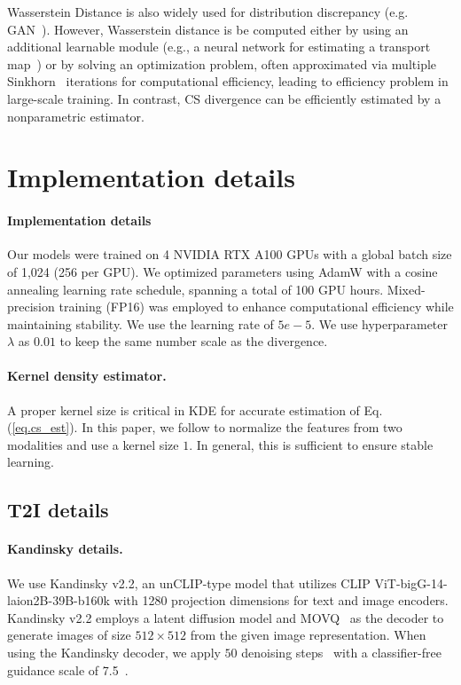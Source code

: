   Wasserstein Distance is also widely used for distribution discrepancy (e.g. GAN~\citep{arjovsky2017wasserstein}). However, Wasserstein distance is be computed either by using an additional learnable module (e.g., a neural network for estimating a transport map~\citep{korotin2022neural}) or by solving an optimization problem, often approximated via multiple Sinkhorn~\citep{cuturi2013sinkhorn} iterations for computational efficiency, leading to efficiency problem in large-scale training. In contrast, CS divergence can be efficiently estimated by a nonparametric estimator. 





\section{Implementation details}
\label{sec:implementation-details}

\paragraph{Implementation details} Our models were trained on 4 NVIDIA RTX A100 GPUs with a global batch size of 1,024 (256 per GPU). We optimized parameters using AdamW with a cosine annealing learning rate schedule, spanning a total of 100 GPU hours. Mixed-precision training (FP16) was employed to enhance computational efficiency while maintaining stability. We use the learning rate of $5e-5$. We use hyperparameter $\lambda$ as $0.01$ to keep the same number scale as the divergence.


\paragraph{Kernel density estimator.} A proper kernel size is critical in KDE for accurate estimation of Eq. (\ref{eq.cs_est}). In this paper, we follow \cite{yindomain} to normalize the features from two modalities and use a kernel size $1$. In general, this is sufficient to ensure stable learning.

 
\subsection{T2I details}

\paragraph{Kandinsky details.} We use Kandinsky v2.2, an unCLIP-type model that utilizes CLIP ViT-bigG-14-laion2B-39B-b160k with 1280 projection dimensions for text and image encoders. Kandinsky v2.2 employs a latent diffusion model and MOVQ~\citep{zheng2022movq} as the decoder to generate images of size $512\times 512$ from the given image representation. When using the Kandinsky decoder, we apply $50$ denoising steps~\citep{ho2020denoising} with a classifier-free guidance scale of 7.5~\citep{ho2022classifier}.

